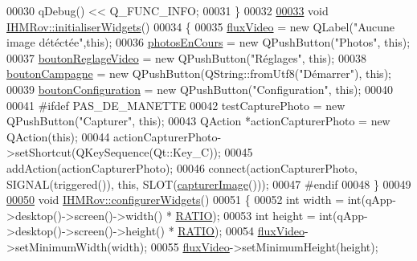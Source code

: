 \begin{DoxyCode}
00030     qDebug() << Q\_FUNC\_INFO;
00031 \}
00032 
\hyperlink{class_i_h_m_rov_a77d08efdfc3292d215af4df0e1af33a8}{00033} \textcolor{keywordtype}{void} \hyperlink{class_i_h_m_rov_a77d08efdfc3292d215af4df0e1af33a8}{IHMRov::initialiserWidgets}()
00034 \{
00035     \hyperlink{class_i_h_m_rov_acdeabe02e1431b5c1817cb2a89debd0a}{fluxVideo} = \textcolor{keyword}{new} QLabel(\textcolor{stringliteral}{"Aucune image détéctée"},\textcolor{keyword}{this});
00036     \hyperlink{class_i_h_m_rov_a0896dea1a2d901a7cf43a344e22fc66d}{photosEnCours} = \textcolor{keyword}{new} QPushButton(\textcolor{stringliteral}{"Photos"}, \textcolor{keyword}{this});
00037     \hyperlink{class_i_h_m_rov_a57cb3bea4f1f9149d730ccc5688581fc}{boutonReglageVideo} = \textcolor{keyword}{new} QPushButton(\textcolor{stringliteral}{"Réglages"}, \textcolor{keyword}{this});
00038     \hyperlink{class_i_h_m_rov_a324be23537f48127c49b943aa439a978}{boutonCampagne} = \textcolor{keyword}{new} QPushButton(QString::fromUtf8(\textcolor{stringliteral}{"Démarrer"}), \textcolor{keyword}{this});
00039     \hyperlink{class_i_h_m_rov_aea67721180bf155892a297b3c39309c5}{boutonConfiguration} = \textcolor{keyword}{new} QPushButton(\textcolor{stringliteral}{"Configuration"}, \textcolor{keyword}{this});
00040 
00041 \textcolor{preprocessor}{    #ifdef PAS\_DE\_MANETTE}
00042     testCapturePhoto = \textcolor{keyword}{new} QPushButton(\textcolor{stringliteral}{"Capturer"}, \textcolor{keyword}{this});
00043     QAction *actionCapturerPhoto = \textcolor{keyword}{new} QAction(\textcolor{keyword}{this});
00044     actionCapturerPhoto->setShortcut(QKeySequence(Qt::Key\_C));
00045     addAction(actionCapturerPhoto);
00046     connect(actionCapturerPhoto, SIGNAL(triggered()), \textcolor{keyword}{this}, SLOT(\hyperlink{class_i_h_m_rov_a15fe4fd090a0171bb9ad24e28d3b978a}{capturerImage}()));
00047 \textcolor{preprocessor}{    #endif}
00048 \}
00049 
\hyperlink{class_i_h_m_rov_aba47130fb875a01eefa09bc875affe6c}{00050} \textcolor{keywordtype}{void} \hyperlink{class_i_h_m_rov_aba47130fb875a01eefa09bc875affe6c}{IHMRov::configurerWidgets}()
00051 \{    
00052     \textcolor{keywordtype}{int} width = int(qApp->desktop()->screen()->width() * \hyperlink{ihmrov_8h_a7e8b3c8482e593df0ace933ad3de22ee}{RATIO});
00053     \textcolor{keywordtype}{int} height = int(qApp->desktop()->screen()->height() * \hyperlink{ihmrov_8h_a7e8b3c8482e593df0ace933ad3de22ee}{RATIO});
00054     \hyperlink{class_i_h_m_rov_acdeabe02e1431b5c1817cb2a89debd0a}{fluxVideo}->setMinimumWidth(width);
00055     \hyperlink{class_i_h_m_rov_acdeabe02e1431b5c1817cb2a89debd0a}{fluxVideo}->setMinimumHeight(height);

\end{DoxyCode}
